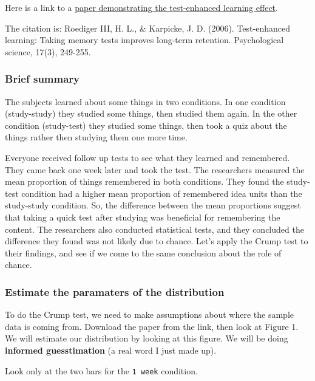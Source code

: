 \documentclass[
]{book}
\begin{document}
Here is a link to a \href{https://www.jstor.org/stable/pdf/40064526.pdf?casa_token=jMQnevvTRoIAAAAA:J96DQ0EHWCDKvjV3D-OdQ7TFnJ_DTZEz_G6zG1YMstqGu7fuzjzM0V4PiNREvB1sfLxTXn68FpHhoIUFpOx9p5fjsB7hcqQTUCQix9jxdj_hx-zqoZ8}{paper demonstrating the test-enhanced learning effect}.

The citation is: Roediger III, H. L., \& Karpicke, J. D. (2006). Test-enhanced learning: Taking memory tests improves long-term retention. Psychological science, 17(3), 249-255.

\hypertarget{brief-summary}{%
\subsubsection{Brief summary}\label{brief-summary}}

The subjects learned about some things in two conditions. In one condition (study-study) they studied some things, then studied them again. In the other condition (study-test) they studied some things, then took a quiz about the things rather then studying them one more time.

Everyone received follow up tests to see what they learned and remembered. They came back one week later and took the test. The researchers measured the mean proportion of things remembered in both conditions. They found the study-test condition had a higher mean proportion of remembered idea units than the study-study condition. So, the difference between the mean proportions suggest that taking a quick test after studying was beneficial for remembering the content. The researchers also conducted statistical tests, and they concluded the difference they found was not likely due to chance. Let's apply the Crump test to their findings, and see if we come to the same conclusion about the role of chance.

\hypertarget{estimate-the-paramaters-of-the-distribution}{%
\subsubsection{Estimate the paramaters of the distribution}\label{estimate-the-paramaters-of-the-distribution}}

To do the Crump test, we need to make assumptions about where the sample data is coming from. Download the paper from the link, then look at Figure 1. We will estimate our distribution by looking at this figure. We will be doing \textbf{informed guesstimation} (a real word I just made up).

Look only at the two bars for the \texttt{1\ week} condition.
\end{document}
